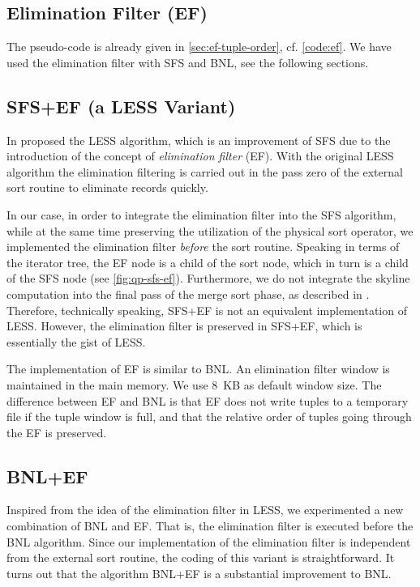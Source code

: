 \subsection{Elimination Filter (EF)}
The pseudo-code is already given in \autoref{sec:ef-tuple-order},
cf. \autoref{code:ef}. We have used the elimination filter with
SFS and BNL, see the following sections.

\subsection{SFS+EF (a LESS Variant)}
In \citep{Godfrey2005}  proposed the LESS
algorithm, which is an improvement of SFS due to the introduction of
the concept of {\em elimination filter} (EF). With the original LESS
algorithm the elimination filtering is carried out in the pass zero of
the external sort routine to eliminate records quickly.

In our case, in order to integrate the elimination filter into the SFS
algorithm, while at the same time preserving the utilization of the
physical sort operator, we implemented the elimination filter {\em
before} the sort routine.  Speaking in terms of the iterator tree, the
EF node is a child of the sort node, which in turn is a child of the
SFS node (see \autoref{fig:qp-sfs-ef}).  Furthermore, we do not
integrate the skyline computation into the final pass of the merge
sort phase, as described in \citep{Godfrey2005}.  Therefore,
technically speaking, SFS+EF is not an equivalent implementation of
LESS.  However, the elimination filter is preserved in SFS+EF, which
is essentially the gist of LESS.

The implementation of EF is similar to BNL.  An elimination filter
window is maintained in the main memory.  We use 8~KB as default
window size.  The difference between EF and BNL is that EF does not
write tuples to a temporary file if the tuple window is full, and that
the relative order of tuples going through the EF is preserved.



\subsection{BNL+EF}
Inspired from the idea of the elimination filter in LESS, we
experimented a new combination of BNL and EF. That is, the elimination
filter is executed before the BNL algorithm. Since our implementation
of the elimination filter is independent from the external sort
routine, the coding of this variant is straightforward.  It turns out
that the algorithm BNL+EF is a substantial improvement to BNL.



